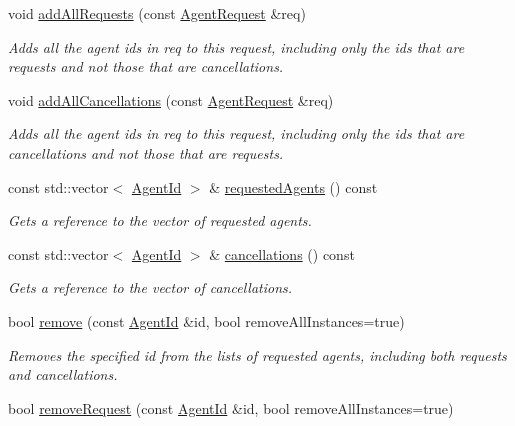 \begin{DoxyCompactItemize}
void \hyperlink{classrepast_1_1_agent_request_ac435adefd74246589b3028dc7aeef5a9}{add\-All\-Requests} (const \hyperlink{classrepast_1_1_agent_request}{Agent\-Request} \&req)
\begin{DoxyCompactList}\small\item\em Adds all the agent ids in req to this request, including only the ids that are requests and not those that are cancellations. \end{DoxyCompactList}\item 
void \hyperlink{classrepast_1_1_agent_request_a446efb284f4804f6d0123c71995237ee}{add\-All\-Cancellations} (const \hyperlink{classrepast_1_1_agent_request}{Agent\-Request} \&req)
\begin{DoxyCompactList}\small\item\em Adds all the agent ids in req to this request, including only the ids that are cancellations and not those that are requests. \end{DoxyCompactList}\item 
const std\-::vector$<$ \hyperlink{classrepast_1_1_agent_id}{Agent\-Id} $>$ \& \hyperlink{classrepast_1_1_agent_request_a7961c3fda219def5e403ec610044524e}{requested\-Agents} () const 
\begin{DoxyCompactList}\small\item\em Gets a reference to the vector of requested agents. \end{DoxyCompactList}\item 
const std\-::vector$<$ \hyperlink{classrepast_1_1_agent_id}{Agent\-Id} $>$ \& \hyperlink{classrepast_1_1_agent_request_aeb621d544c5a888b56407b21d1d37259}{cancellations} () const 
\begin{DoxyCompactList}\small\item\em Gets a reference to the vector of cancellations. \end{DoxyCompactList}\item 
bool \hyperlink{classrepast_1_1_agent_request_a2f984bd8eb8e2dc0ef83ad33de0b7785}{remove} (const \hyperlink{classrepast_1_1_agent_id}{Agent\-Id} \&id, bool remove\-All\-Instances=true)
\begin{DoxyCompactList}\small\item\em Removes the specified id from the lists of requested agents, including both requests and cancellations. \end{DoxyCompactList}\item 
bool \hyperlink{classrepast_1_1_agent_request_a6c96d538e1018733866642978a83e509}{remove\-Request} (const \hyperlink{classrepast_1_1_agent_id}{Agent\-Id} \&id, bool remove\-All\-Instances=true)

\end{DoxyCompactItemize}
